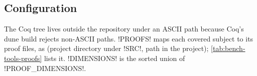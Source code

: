 {\subsection{Configuration}


The Coq tree lives outside the repository under an ASCII path because Coq's dune build rejects non-ASCII paths. \py!PROOFS! maps each covered subject to its proof files, as (project directory under \py!SRC!, path in the project); \cref{tab:bench-tools-proofs} lists it. \py!DIMENSIONS! is the sorted union of \py!PROOF_DIMENSIONS!.

}
